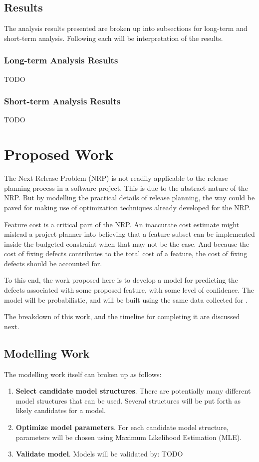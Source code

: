 \documentclass[a4paper]{scrartcl}
\begin{document}
\subsection{Results}
The analysis results presented are broken up into subsections for long-term and short-term analysis. Following each will be interpretation of the results.

\subsubsection{Long-term Analysis Results}
TODO

\subsubsection{Short-term Analysis Results}
TODO

\section{Proposed Work}
\label{sec:proposed_work}

The Next Release Problem (NRP) is not readily applicable to the release planning process in a software project. This is due to the abstract nature of the NRP. But by modelling the practical details of release planning, the way could be paved for making use of optimization techniques already developed for the NRP.

Feature cost is a critical part of the NRP. An inaccurate cost estimate might mislead a project planner into believing that a feature subset can be implemented inside the budgeted constraint when that may not be the case. And because the cost of fixing defects contributes to the total cost of a feature, the cost of fixing defects should be accounted for.

To this end, the work proposed here is to develop a model for predicting the defects associated with some proposed feature, with some level of confidence. The model will be probabilistic, and will be built using the same data collected for .

The breakdown of this work, and the timeline for completing it are discussed next.

\subsection{Modelling Work}
The modelling work itself can broken up as follows:
\begin{enumerate}
\item
\textbf{Select candidate model structures}. There are potentially many different model structures that can be used. Several structures will be put forth as likely candidates for a model.
\item
\textbf{Optimize model parameters}. For each candidate model structure, parameters will be chosen using Maximum Likelihood Estimation (MLE).
\item
\textbf{Validate model}. Models will be validated by: TODO 
\end{enumerate}
\end{document}
